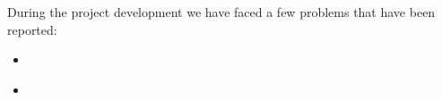 \documentclass[11pt,a4paper]{article}
\begin{document}
During the project development we have faced a few problems that have been reported:
\begin{itemize}
    \item \href{https://github.com/IBM-Bluemix-Docs/ContinuousDelivery/issues/13}{}
    \item \href{https://github.com/IBM-Cloud/aspnet-core-helloworld/issues/39}{\color{urlcolor}{github.com/IBM-Cloud/aspnet-core-helloworld/issues/39}}
\end{itemize}
\end{document}
